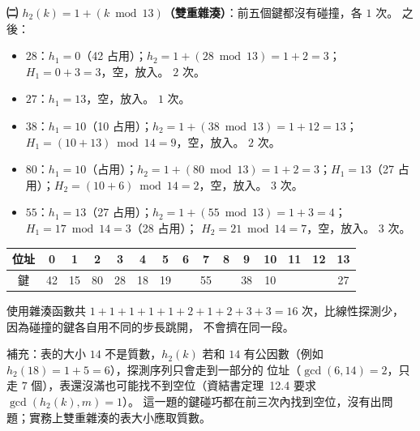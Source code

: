 \begin{pastsoln}
\textbf{㈡ $h_2(k) = 1 + (k \bmod 13)$（雙重雜湊）}：前五個鍵都沒有碰撞，各 $1$ 次。 之後：
\begin{itemize}
\item $28$：$h_1 = 0$（42 占用）；$h_2 = 1 + (28 \bmod 13) = 1 + 2 = 3$；$H_1 = 0 + 3 = 3$，空，放入。 $2$ 次。
\item $27$：$h_1 = 13$，空，放入。 $1$ 次。
\item $38$：$h_1 = 10$（10 占用）；$h_2 = 1 + (38 \bmod 13) = 1 + 12 = 13$；$H_1 = (10 + 13) \bmod 14 = 9$，空，放入。 $2$ 次。
\item $80$：$h_1 = 10$（占用）；$h_2 = 1 + (80 \bmod 13) = 1 + 2 = 3$；$H_1 = 13$（27 占用）；$H_2 = (10 + 6) \bmod 14 = 2$，空，放入。 $3$ 次。
\item $55$：$h_1 = 13$（27 占用）；$h_2 = 1 + (55 \bmod 13) = 1 + 3 = 4$；$H_1 = 17 \bmod 14 = 3$（28 占用）；
$H_2 = 21 \bmod 14 = 7$，空，放入。 $3$ 次。
\end{itemize}
\begin{center}
\small
\setlength{\tabcolsep}{4pt}
\begin{tabular}{c|cccccccccccccc}
位址 & 0 & 1 & 2 & 3 & 4 & 5 & 6 & 7 & 8 & 9 & 10 & 11 & 12 & 13 \\
\hline
鍵 & 42 & 15 & 80 & 28 & 18 & 19 & & 55 & & 38 & 10 & & & 27 \\
\end{tabular}
\end{center}
使用雜湊函數共 $1 + 1 + 1 + 1 + 1 + 2 + 1 + 2 + 3 + 3 = 16$ 次，比線性探測少，因為碰撞的鍵各自用不同的步長跳開，
不會擠在同一段。

補充：表的大小 $14$ 不是質數，$h_2(k)$ 若和 $14$ 有公因數（例如 $h_2(18) = 1 + 5 = 6$），探測序列只會走到一部分的
位址（$\gcd(6, 14) = 2$，只走 $7$ 個），表還沒滿也可能找不到空位（資結書定理~12.4 要求 $\gcd(h_2(k), m) = 1$）。
這一題的鍵碰巧都在前三次內找到空位，沒有出問題；實務上雙重雜湊的表大小應取質數。
\end{pastsoln}
